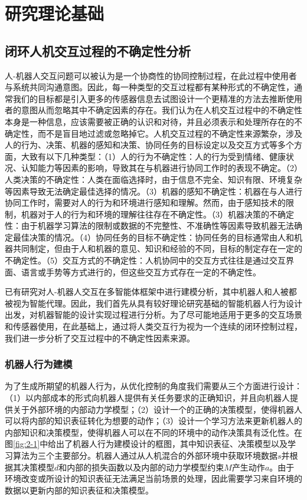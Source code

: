 \chapter{研究理论基础}

\section{闭环人机交互过程的不确定性分析}
人-机器人交互问题可以被认为是一个协商性的协同控制过程，在此过程中使用者与系统共同沟通意图。因此，每一种类型的交互过程都有某种形式的不确定性，通常我们的目标都是引入更多的传感器信息去试图设计一个更精准的方法去推断使用者的意图从而忽略其中不确定因素的存在。我们认为在人机交互过程中的不确定性本身是一种信息，应该需要被正确的认识和对待，并且必须表示和处理所存在的不确定性，而不是盲目地过滤或忽略掉它。人机交互过程的不确定性来源繁杂，涉及人的行为、决策、机器的感知和决策、协同任务的目标设定以及交互方式等多个方面，大致有以下几种类型：（1）人的行为不确定性：人的行为受到情绪、健康状况、认知能力等因素的影响，导致其在与机器进行协同工作时的表现不确定。（2）人类决策的不确定性：人类在面临选择时，由于信息不完全、知识有限、环境复杂等因素导致无法确定最佳选择的情况。（3）机器的感知不确定性：机器在与人进行协同工作时，需要对人的行为和环境进行感知和理解。然而，由于感知技术的限制，机器对于人的行为和环境的理解往往存在不确定性。（3）机器决策的不确定性：由于机器学习算法的限制或数据的不完整性、不准确性等因素导致机器无法确定最佳决策的情况。（4）协同任务的目标不确定性：协同任务的目标通常由人和机器共同制定，但由于人和机器的意见、知识和经验的不同，目标的制定存在一定的不确定性。（5）交互方式的不确定性：人机协同中的交互方式往往是通过交互界面、语言或手势等方式进行的，但这些交互方式存在一定的不确定性。

已有研究对人-机器人交互在多智能体框架中进行建模分析，其中机器人和人被都被视为智能代理\cite{liuDesigningRobotBehavior}。因此，我们首先从具有较好理论研究基础的智能机器人行为设计出发，对机器智能的设计实现过程进行分析。为了尽可能地适用于更多的交互场景和传感器使用，在此基础上，通过将人类交互行为视为一个连续的闭环控制过程，我们进一步分析了交互过程中的不确定性因素来源。

\subsection{机器人行为建模}
为了生成所期望的机器人行为，从优化控制的角度我们需要从三个方面进行设计\cite{liuDesigningRobotBehavior}：（1）以内部成本的形式向机器人提供有关任务要求的正确知识，并且向机器人提供关于外部环境的内部动力学模型；（2）设计一个的正确的决策模型，使得机器人可以将内部的知识表征转化为想要的动作；（3）设计一个学习方法来更新机器人的内部知识和决策模型，使得机器人可以在不同的环境中的动作决策具有泛化性。在图\ref{fig:2-1}中给出了机器人行为建模设计的框图，其中知识表征、决策模型以及学习算法为三个主要部分。机器人通过从人机混合的外部环境中获取环境数据$s$并根据其决策模型$d$和内部的损失函数以及内部的动力学模型约束$M$产生动作$a$。由于环境改变或所设计的知识表征无法满足当前场景的处理，因此需要学习来自环境的数据以更新内部的知识表征和决策模型。

